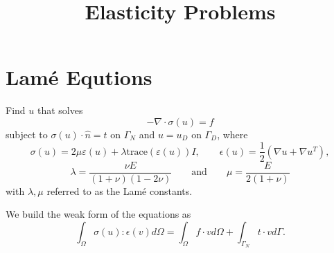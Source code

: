 \documentclass[11pt]{amsart}
\title{Elasticity Problems}
\date{}
\begin{document}
\maketitle

\section{Lam\'e Equtions}
Find $u$ that solves
%
\begin{displaymath}
  -\nabla\cdot \sigma(u) = f
\end{displaymath}
%
subject to $\sigma(u)\cdot\hat{n} = t$ on $\Gamma_N$ and $u=u_D$ on $\Gamma_D$, where
%
\begin{displaymath}
  \sigma(u) = 2\mu \varepsilon(u) + \lambda \mbox{trace}(\varepsilon(u)) I,
  \qquad
  \epsilon(u) = \frac{1}{2}\left( \nabla u + \nabla u^T \right),
\end{displaymath}
%
\begin{displaymath}
  \lambda = \frac{\nu E}{(1+\nu)(1-2\nu)} \qquad \mbox{and} \qquad
  \mu = \frac{E}{2(1+\nu)}
\end{displaymath}
%
with $\lambda, \mu$ referred to as the Lam\'e constants.

We build the weak form of the equations as
%
\begin{displaymath}
  \int_\Omega \sigma(u) : \epsilon(v) d\Omega = \int_\Omega f\cdot v d\Omega
  + \int_{\Gamma_N} t\cdot v d\Gamma.
\end{displaymath}
\end{document}
